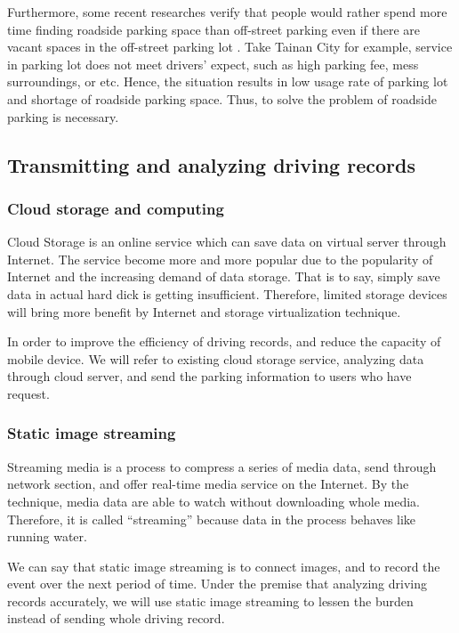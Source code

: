 \documentclass[runningheads,a4paper]{llncs}
\begin{document}
\begin{CJK}{UTF8}{bsmi}
Furthermore, some recent researches verify that people would rather
spend more time finding roadside parking space than off-street parking
even if there are vacant spaces in the off-street parking lot \cite{OnStreetParking}. Take
Tainan City for example, service in parking lot does not meet drivers'
expect, such as high parking fee, mess surroundings, or etc. Hence, the
situation results in low usage rate of parking lot and shortage of
roadside parking space. Thus, to solve the problem of roadside parking
is necessary.

%
\subsection{Transmitting and analyzing driving records}
%

%
\subsubsection{Cloud storage and computing}
%

Cloud Storage is an online service which can save data on virtual server
through Internet. The service become more and more popular due to the
popularity of Internet and the increasing demand of data storage. That
is to say, simply save data in actual hard dick is getting insufficient.
Therefore, limited storage devices will bring more benefit by Internet
and storage virtualization technique.

In order to improve the efficiency of driving records, and reduce the
capacity of mobile device. We will refer to existing cloud storage
service, analyzing data through cloud server, and send the parking
information to users who have request.

%
\subsubsection{Static image streaming}
%

Streaming media is a process to compress a series of media data, send
through network section, and offer real-time media service on the
Internet. By the technique, media data are able to watch without
downloading whole media. Therefore, it is called ``streaming'' because
data in the process behaves like running water.

We can say that static image streaming is to connect images, and to
record the event over the next period of time. Under the premise that
analyzing driving records accurately, we will use static image streaming
to lessen the burden instead of sending whole driving record.


\end{CJK}
\end{document}
